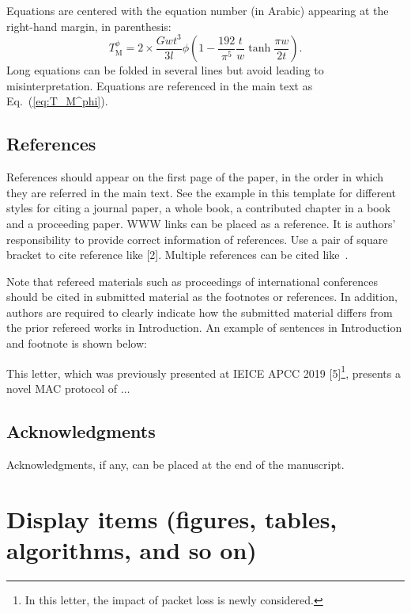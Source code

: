 \documentclass{comex}
\begin{document}
Equations are centered with the equation number (in Arabic) appearing at
the right-hand margin, in parenthesis:
\begin{equation}
T_{\mbox{M}}^{\phi} = 2 \times \frac{G w t^3}{3 l} \phi \left( 1 - \frac{192}{\pi^5} {\frac{t}{w}} \tanh \frac{\pi w}{2 t} \right).
\label{eq:T_M^phi}
\end{equation}
\noindent
%
Long equations can be folded in several lines but avoid leading to
misinterpretation. Equations are referenced in the main text as
Eq.~(\ref{eq:T_M^phi}).


\subsection{References}

References should appear on the first page of the paper, in the order in
which they are referred in the main text. See the example in this
template for different styles for citing a journal paper, a whole book,
a contributed chapter in a book and a proceeding paper. WWW links can be
placed as a reference. It is authors' responsibility to provide correct
information of references. Use a pair of square bracket to cite
reference like [2]. Multiple references can be cited like~\cite{journal_paper,chapter,book,proceeding_paper}.

Note that refereed materials such as proceedings of international conferences should be cited in 
submitted material as the footnotes or references. 
In addition, authors are required to clearly indicate how the submitted material differs from the 
prior refereed works in Introduction. 
An example of sentences in Introduction and footnote is shown below:

This letter, which was previously presented at IEICE APCC 2019 [5]\footnote{In this letter, the impact of packet loss is newly considered.}, 
presents a novel MAC protocol of $\ldots$


\subsection{Acknowledgments}

Acknowledgments, if any, can be placed at the end of the manuscript.

\section{Display items (figures, tables, algorithms, and so on)}
\end{document}
